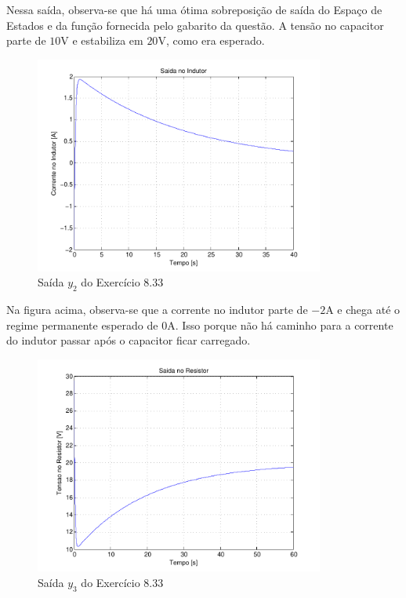 \documentclass{report}
\begin{document}
Nessa saída, observa-se que há uma ótima sobreposição de saída do Espaço de Estados e da função fornecida pelo gabarito da questão.
A tensão no capacitor parte de $ 10\text{V} $ e estabiliza em $ 20\text{V} $, como era esperado.

\clearpage
\begin{figure}[h!]
    \centering
    \includegraphics[width=0.85\textwidth]{images/plots/plot_8_33_y2.pdf}
    \caption{\label{plot:8.33_y2} Saída $ y_2 $ do Exercício 8.33}
\end{figure}

Na figura acima, observa-se que a corrente no indutor parte de $ -2\text{A} $ e chega até o regime permanente esperado de $ 0\text{A} $. Isso
porque não há caminho para a corrente do indutor passar após o capacitor ficar carregado.

\begin{figure}[h!]
    \centering
    \includegraphics[width=0.85\textwidth]{images/plots/plot_8_33_y3.pdf}
    \caption{\label{plot:8.33_y3} Saída $ y_3 $ do Exercício 8.33}
\end{figure}
\end{document}
